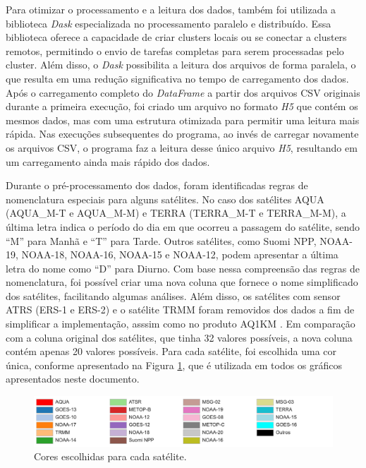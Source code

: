 \documentclass[cic,tc]{iiufrgs}
\begin{document}
Para otimizar o processamento e a leitura dos dados, também foi utilizada a biblioteca \textit{Dask} especializada no processamento paralelo e distribuído. Essa biblioteca oferece a capacidade de criar clusters locais ou se conectar a clusters remotos, permitindo o envio de tarefas completas para serem processadas pelo cluster. Além disso, o \textit{Dask} possibilita a leitura dos arquivos de forma paralela, o que resulta em uma redução significativa no tempo de carregamento dos dados. Após o carregamento completo do \textit{DataFrame} a partir dos arquivos CSV originais durante a primeira execução, foi criado um arquivo no formato \textit{H5} que contém os mesmos dados, mas com uma estrutura otimizada para permitir uma leitura mais rápida. Nas execuções subsequentes do programa, ao invés de carregar novamente os arquivos CSV, o programa faz a leitura desse único arquivo \textit{H5}, resultando em um carregamento ainda mais rápido dos dados.

Durante o pré-processamento dos dados, foram identificadas regras de nomenclatura especiais para alguns satélites. No caso dos satélites AQUA (AQUA\_M-T e AQUA\_M-M) e TERRA (TERRA\_M-T e TERRA\_M-M), a última letra indica o período do dia em que ocorreu a passagem do satélite, sendo ``M'' para Manhã e ``T'' para Tarde. Outros satélites, como Suomi NPP, NOAA-19, NOAA-18, NOAA-16, NOAA-15 e NOAA-12, podem apresentar a última letra do nome como ``D'' para Diurno. Com base nessa compreensão das regras de nomenclatura, foi possível criar uma nova coluna que fornece o nome simplificado dos satélites, facilitando algumas análises. Além disso, os satélites com sensor ATRS (ERS-1 e ERS-2) e o satélite TRMM foram removidos dos dados a fim de simplificar a implementação, asssim como no produto AQ1KM \citep{libonati2015algorithm}. Em comparação com a coluna original dos satélites, que tinha 32 valores possíveis, a nova coluna contém apenas 20 valores possíveis. Para cada satélite, foi escolhida uma cor única, conforme apresentado na Figura \ref{fig:cores_satelites}, que é utilizada em todos os gráficos apresentados neste documento. 

\begin{figure}[H]
    \caption{Cores escolhidas para cada satélite.}
    \begin{center}
        \includegraphics[width=35em]{cores_satelites}
    \end{center}
    \label{fig:cores_satelites}
\end{figure}
\end{document}
